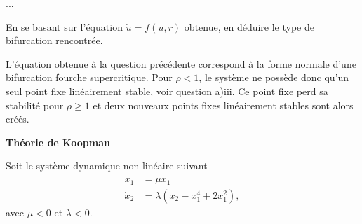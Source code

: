 \documentclass[12pt, answers]{exam}
\begin{document}
\begin{questions}
\begin{parts}
\begin{subparts}
      \begin{solution}
        {\color{blue}
        ...
        }
      \end{solution}

      \subpart[1] En se basant sur l'équation $\dot{u} = f(u, r)$ obtenue, en déduire le type de bifurcation rencontrée.

      \begin{solution}
        {\color{blue}
        L'équation obtenue à la question précédente correspond à la forme normale d'une bifurcation fourche supercritique. Pour $\rho < 1$, le système ne possède donc qu'un seul point fixe linéairement stable, voir question a)iii. Ce point fixe perd sa stabilité pour $\rho \geq 1$ et deux nouveaux points fixes linéairement stables sont alors créés.
        }
      \end{solution}

    \end{subparts}
  \end{parts}

  \bigskip

  \addpoints
  \question[10] \textbf{Théorie de Koopman}

  \medskip

  Soit le système dynamique non-linéaire suivant
  \begin{equation}
    \begin{aligned}
      \dot{x}_1 & = \mu x_1 \\
      \dot{x}_2 & = \lambda \left( x_2 - x_1^4 + 2 x_1^2 \right),
    \end{aligned}
    \label{eq: exercise 1}
  \end{equation}
  avec $\mu < 0$ et $\lambda < 0$.


\end{questions}
\end{document}
